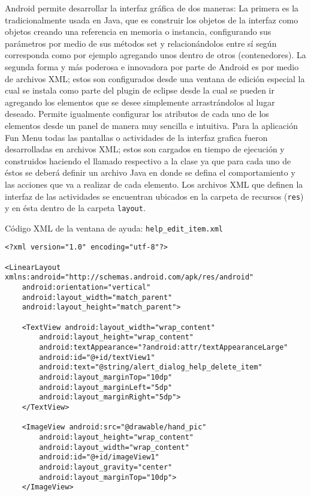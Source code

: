 \documentclass[letterpaper,12pt]{book}
\begin{document}
\begin{mainmatter}
Android  permite desarrollar la  interfaz gráfica  de dos  maneras: La
primera es  la tradicionalmente  usada en Java,  que es  construir los
objetos de la interfaz como  objetos creando una referencia en memoria
o instancia, configurando sus parámetros  por medio de sus métodos set y
relacionándolos entre sí  según corresponda como por ejemplo agregando
unos dentro de otros (contenedores).   La segunda forma y más poderosa
e innovadora por parte de Android es por medio de archivos XML; estos
son  configurados desde  una ventana  de edición  especial la  cual se
instala como  parte del plugin  de eclipse desde  la cual se  pueden ir
agregando  los elementos  que se  desee simplemente  arrastrándolos al
lugar deseado. Permite igualmente configurar los atributos de cada uno
de los  elementos desde un panel  de manera muy  sencilla e intuitiva.
Para la  aplicación Fun Menu todas  las pantallas o  actividades de la
interfaz  grafica  fueron desarrolladas  en  archivos  XML; estos  son
cargados  en tiempo  de ejecución  y construidos  haciendo  el llamado
respectivo a la clase ya que  para cada uno de éstos se deberá definir
un archivo Java en donde se  defina el comportamiento y las acciones que
va a realizar de cada elemento. Los archivos XML que definen la interfaz de
las actividades se encuentran ubicados en la carpeta de recursos (\texttt{res})
y en ésta dentro de la carpeta \texttt{layout}.

Código XML de la ventana de ayuda: \texttt{help\_edit\_item.xml}

\lstset{language=Xml, tabsize=2, showstringspaces=false}\ttfamily
\begin{scriptsize}
\begin{lstlisting}
<?xml version="1.0" encoding="utf-8"?>

<LinearLayout xmlns:android="http://schemas.android.com/apk/res/android"
	android:orientation="vertical" 
	android:layout_width="match_parent"
	android:layout_height="match_parent">

	<TextView android:layout_width="wrap_content"
		android:layout_height="wrap_content" 
		android:textAppearance="?android:attr/textAppearanceLarge"
		android:id="@+id/textView1" 
		android:text="@string/alert_dialog_help_delete_item"
		android:layout_marginTop="10dp" 
		android:layout_marginLeft="5dp"
		android:layout_marginRight="5dp">
	</TextView>

	<ImageView android:src="@drawable/hand_pic"
		android:layout_height="wrap_content" 
		android:layout_width="wrap_content"
		android:id="@+id/imageView1" 
		android:layout_gravity="center"
		android:layout_marginTop="10dp">
	</ImageView>


\end{lstlisting}
\end{scriptsize}
\end{mainmatter}
\end{document}
